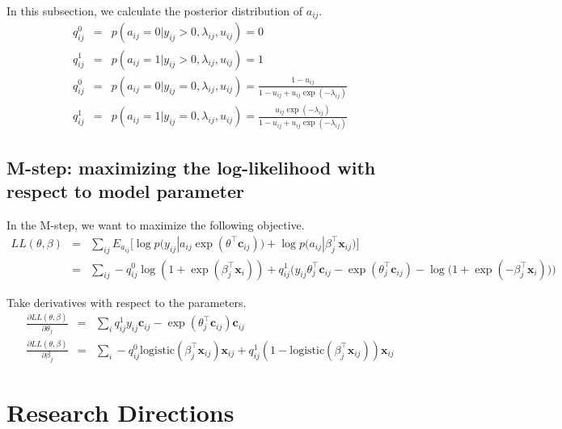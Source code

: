 \documentclass{article}
\begin{document}
In this subsection, we calculate the posterior distribution of $a_{ij}$.
\begin{eqnarray}
q_{ij}^{0} &=& p(a_{ij} = 0 | y_{ij} > 0, \lambda_{ij}, u_{ij}) =  0 \\
q_{ij}^{1} &=& p(a_{ij} = 1 | y_{ij} > 0, \lambda_{ij}, u_{ij}) =  1 \\[10pt]
q_{ij}^{0} &=& p(a_{ij} = 0 | y_{ij} = 0, \lambda_{ij}, u_{ij}) =  \frac{1 - u_{ij}}{1 - u_{ij} + u_{ij}\exp(-\lambda_{ij})} \\
q_{ij}^{1} &=& p(a_{ij} = 1 | y_{ij} = 0, \lambda_{ij}, u_{ij}) =  \frac{u_{ij}\exp(-\lambda_{ij})}{1 - u_{ij} + u_{ij}\exp(-\lambda_{ij})}
\end{eqnarray}


\subsection{M-step: maximizing the log-likelihood with respect to model parameter}

In the M-step, we want to maximize the following objective. 
\begin{eqnarray}
LL(\theta, \beta) &=& \sum_{ij} E_{a_{ij}} \Big[\log p\big(y_{ij} | a_{ij} \exp(\theta^\top \mathbf{c}_{ij})\big) + \log p\big(a_{ij} | \beta_j^\top \mathbf{x}_{ij}\big)\Big] \nonumber\\
&=& \sum_{ij}  - q_{ij}^0 \log (1 +  \exp(\beta_j^\top \mathbf{x}_i)) + q_{ij}^1 \Big( y_{ij}\theta_{j}^\top \mathbf{c}_{ij} - \exp(\theta_{j}^\top \mathbf{c}_{ij}) - \log \big(1 + \exp( - \beta_j^\top \mathbf{x}_i) \big) \Big) \nonumber
\end{eqnarray}

Take derivatives with respect to the parameters. 
\begin{eqnarray}
\frac{\partial LL(\theta, \beta)}{\partial \theta_j} &=& \sum_{i} q_{ij}^1 y_{ij} \mathbf{c}_{ij} - \exp(
\theta_j^\top \mathbf{c}_{ij}) \mathbf{c}_{ij} \\
\frac{\partial LL(\theta, \beta)}{\partial \beta_j} &=& \sum_{i} - q_{ij}^0 \mathrm{logistic}(\beta_j^\top \mathbf{x}_{ij}) \mathbf{x}_{ij} + q_{ij}^1 (1 - \mathrm{logistic}(\beta_j^\top \mathbf{x}_{ij})) \mathbf{x}_{ij}
\end{eqnarray}



\section{Research Directions}
\end{document}
